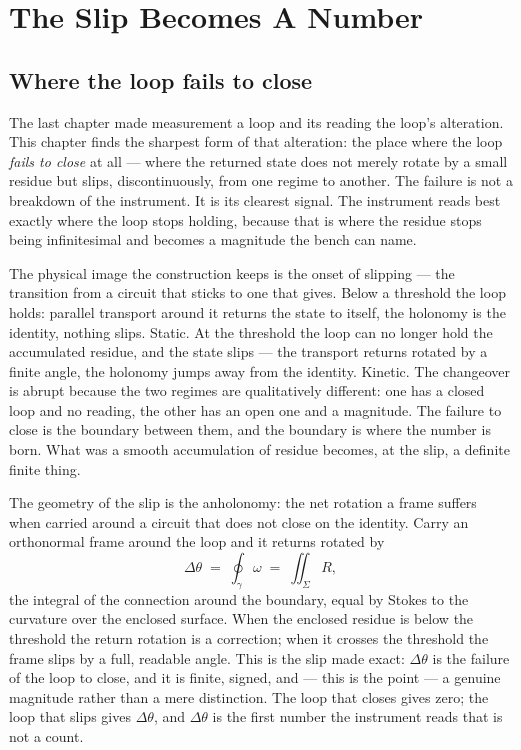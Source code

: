 \chapter{The Slip Becomes A Number}

\section{Where the loop fails to close}

The last chapter made measurement a loop and its reading the loop's alteration. This chapter finds the sharpest form of that
alteration: the place where the loop \emph{fails to close} at all --- where the returned state does not merely rotate by a
small residue but slips, discontinuously, from one regime to another. The failure is not a breakdown of the instrument. It is
its clearest signal. The instrument reads best exactly where the loop stops holding, because that is where the residue stops
being infinitesimal and becomes a magnitude the bench can name.

The physical image the construction keeps is the onset of slipping --- the transition from a circuit that sticks to one that
gives. Below a threshold the loop holds: parallel transport around it returns the state to itself, the holonomy is the
identity, nothing slips. Static. At the threshold the loop can no longer hold the accumulated residue, and the state slips
--- the transport returns rotated by a finite angle, the holonomy jumps away from the identity. Kinetic. The changeover is
abrupt because the two regimes are qualitatively different: one has a closed loop and no reading, the other has an open one
and a magnitude. The failure to close is the boundary between them, and the boundary is where the number is born. What was a
smooth accumulation of residue becomes, at the slip, a definite finite thing.

The geometry of the slip is the anholonomy: the net rotation a frame suffers when carried around a circuit that does not
close on the identity. Carry an orthonormal frame around the loop and it returns rotated by
\[
  \Delta\theta \;=\; \oint_\gamma \omega \;=\; \iint_{\Sigma} R ,
\]
the integral of the connection around the boundary, equal by Stokes to the curvature over the enclosed surface. When the
enclosed residue is below the threshold the return rotation is a correction; when it crosses the threshold the frame slips by
a full, readable angle. This is the slip made exact: $\Delta\theta$ is the failure of the loop to close, and it is finite,
signed, and --- this is the point --- a genuine magnitude rather than a mere distinction. The loop that closes gives zero;
the loop that slips gives $\Delta\theta$, and $\Delta\theta$ is the first number the instrument reads that is not a count.


